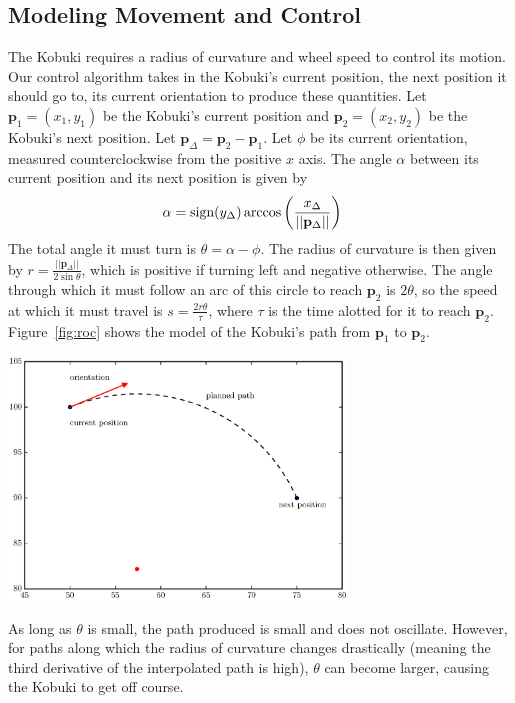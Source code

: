 \documentclass[10pt]{article}
\newenvironment{Figure}
  {\par\medskip\noindent\minipage{\linewidth}}
  {\endminipage\par\medskip}
\begin{document}
\begin{multicols*}{2}
  \section*{Modeling Movement and Control}
  The Kobuki requires a radius of curvature and wheel speed to control its
  motion. Our control algorithm takes in the Kobuki's current position, the next
  position it should go to, its current orientation to produce these quantities.
  Let $\mathbf{p}_1 = (x_1, y_1)$ be the Kobuki's current position and
  $\mathbf{p}_2 = (x_2, y_2)$ be the Kobuki's next position. Let
  $\mathbf{p}_{\Delta} = \mathbf{p}_2 - \mathbf{p}_1$. Let $\phi$ be its
  current orientation, measured counterclockwise from the positive $x$ axis. The
  angle $\alpha$ between its current position and its next position is given by
  \begin{align*}
    \alpha &= \text{sign}(y_{\Delta})
    \arccos\left(\frac{x_{\Delta}}{||\mathbf{p}_{\Delta}||}\right)
  \end{align*}
  The total angle it must turn is $\theta = \alpha - \phi$. The radius of
  curvature is then given by $r = \frac{||\mathbf{p}_{\Delta}||}{2\sin \theta}$,
  which is positive if turning left and negative otherwise. The angle through
  which it must follow an arc of this circle to reach $\mathbf{p}_2$ is $2
  \theta$, so the speed at which it must travel is $s = \frac{2r\theta}{\tau}$,
  where $\tau$ is the time alotted for it to reach $\mathbf{p}_2$.
  Figure~\ref{fig:roc} shows the model of the Kobuki's path from $\mathbf{p}_1$
  to $\mathbf{p}_2$.

  \begin{Figure}
    \includegraphics[width=9cm]{../plots/roc.eps}
     \label{fig:roc}
  \end{Figure}

  As long as $\theta$ is small, the path produced is small and does not
  oscillate. However, for paths along which the radius of curvature changes
  drastically (meaning the third derivative of the interpolated path is high),
  $\theta$ can become larger, causing the Kobuki to get off course.


\end{multicols*}
\end{document}
